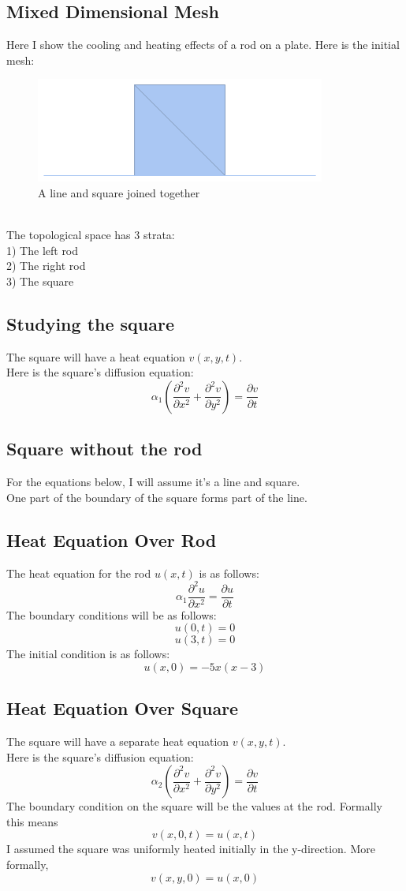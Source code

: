 \documentclass[twoside,11pt]{article}
\theoremstyle{definition}
\begin{document}
\subsection{Mixed Dimensional Mesh}

Here I show the cooling and heating effects of a rod on a plate. Here is the initial mesh:
\begin{figure}[h]
\centering
\includegraphics[width=3 in]{mixedMeshPic.png}
\caption{A line and square joined together}
\end{figure}
\\
The topological space has 3 strata: \\
1) The left rod\\
2) The right rod\\
3) The square

\subsection{Studying the square}

The square will have a heat equation $v(x,y,t)$. \\
Here is the square's diffusion equation:
\[
\alpha_1 (\frac{\partial^2 v}{\partial x^2} + \frac{\partial^2 v}{\partial y^2}) = \frac{\partial v}{\partial t}
\]

\subsection{Square without the rod}


For the equations below, I will assume it's a line and square. \\
One part of the boundary of the square forms part of the line. 

\subsection{Heat Equation Over Rod}

The heat equation for the rod $u(x,t)$ is as follows:
\[
\alpha_1 \frac{\partial^2 u}{\partial x^2} = \frac{\partial u}{\partial t}
\]
The boundary conditions will be as follows:
\[
u(0,t)=0
\]
\[
u(3,t)=0
\]
The initial condition is as follows:
\[
u(x,0)=-5x(x-3)
\]

\subsection{Heat Equation Over Square}

The square will have a separate heat equation $v(x,y,t)$. \\
Here is the square's diffusion equation:
\[
\alpha_2 (\frac{\partial^2 v}{\partial x^2} + \frac{\partial^2 v}{\partial y^2}) = \frac{\partial v}{\partial t}
\]
The boundary condition on the square will be the values at the rod. Formally this means
\[
v(x,0,t)=u(x,t)
\]
I assumed the square was uniformly heated initially in the y-direction. More formally, 
\[
v(x,y,0)=u(x,0)
\]
\end{document}

